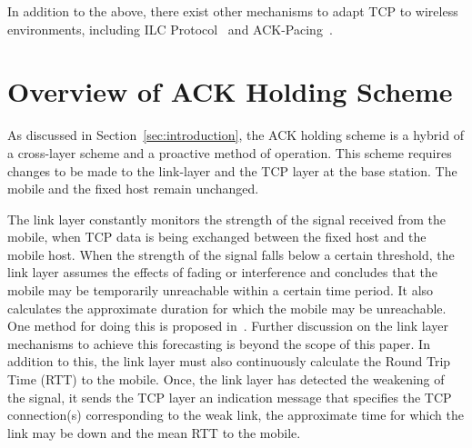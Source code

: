 \documentclass[conference]{IEEEtran}
\begin{document}
In addition to the above, there exist other mechanisms to adapt TCP to wireless environments, including ILC Protocol~\cite{Chinta2003} and ACK-Pacing~\cite{Cho2003}. 

\section{Overview of ACK Holding Scheme}
\label{sec:overview-ack-holding}
As discussed in Section~\ref{sec:introduction}, the ACK holding scheme is a hybrid of a cross-layer scheme and a proactive method of operation. This scheme requires changes to be made to the link-layer and the TCP layer at the base station. The mobile and the fixed host remain unchanged. 

The link layer constantly monitors the strength of the signal received from the mobile, when TCP data is being exchanged between the fixed host and the mobile host. When the strength of the signal falls below a certain threshold, the link layer assumes the effects of fading or interference and concludes that the mobile may be temporarily unreachable within a certain time period. It also calculates the approximate duration for which the mobile may be unreachable. One method for doing this is proposed in~\cite{multipath}. Further discussion on the link layer mechanisms to achieve this forecasting is beyond the scope of this paper. In addition to this, the link layer must also continuously calculate the Round Trip Time (RTT) to the mobile. Once, the link layer has detected the weakening of the signal, it sends the TCP layer an indication message that specifies the TCP connection(s) corresponding to the weak link, the approximate time for which the link may be down and the mean RTT to the mobile.
\end{document}
